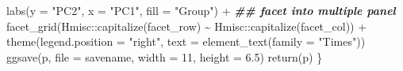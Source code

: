 \documentclass[
]{article}
\newenvironment{Shaded}{\begin{snugshade}}{\end{snugshade}}
\newcommand{\AttributeTok}[1]{\textcolor[rgb]{0.77,0.63,0.00}{#1}}
\newcommand{\DecValTok}[1]{\textcolor[rgb]{0.00,0.00,0.81}{#1}}
\newcommand{\DocumentationTok}[1]{\textcolor[rgb]{0.56,0.35,0.01}{\textbf{\textit{#1}}}}
\newcommand{\FloatTok}[1]{\textcolor[rgb]{0.00,0.00,0.81}{#1}}
\newcommand{\FunctionTok}[1]{\textcolor[rgb]{0.00,0.00,0.00}{#1}}
\newcommand{\NormalTok}[1]{#1}
\newcommand{\SpecialCharTok}[1]{\textcolor[rgb]{0.00,0.00,0.00}{#1}}
\newcommand{\StringTok}[1]{\textcolor[rgb]{0.31,0.60,0.02}{#1}}
\begin{document}
\begin{Shaded}
\begin{Highlighting}[]
      \FunctionTok{labs}\NormalTok{(}\AttributeTok{y =} \StringTok{"PC2"}\NormalTok{, }\AttributeTok{x =} \StringTok{"PC1"}\NormalTok{, }\AttributeTok{fill =} \StringTok{"Group"}\NormalTok{) }\SpecialCharTok{+}
      \DocumentationTok{\#\# facet into multiple panel}
      \FunctionTok{facet\_grid}\NormalTok{(Hmisc}\SpecialCharTok{::}\FunctionTok{capitalize}\NormalTok{(facet\_row) }\SpecialCharTok{\textasciitilde{}}\NormalTok{ Hmisc}\SpecialCharTok{::}\FunctionTok{capitalize}\NormalTok{(facet\_col)) }\SpecialCharTok{+}
      \FunctionTok{theme}\NormalTok{(}\AttributeTok{legend.position =} \StringTok{"right"}\NormalTok{,}
            \AttributeTok{text =} \FunctionTok{element\_text}\NormalTok{(}\AttributeTok{family =} \StringTok{"Times"}\NormalTok{))}
    \FunctionTok{ggsave}\NormalTok{(p, }\AttributeTok{file =}\NormalTok{ savename, }\AttributeTok{width =} \DecValTok{11}\NormalTok{, }\AttributeTok{height =} \FloatTok{6.5}\NormalTok{)}
    \FunctionTok{return}\NormalTok{(p)}
\NormalTok{  \}}
\end{Highlighting}
\end{Shaded}
\end{document}
